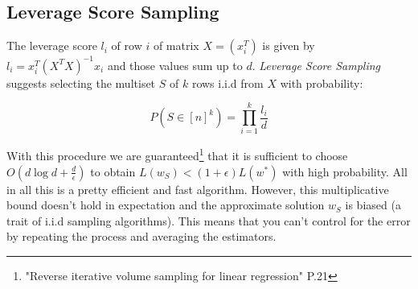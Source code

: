 \documentclass{article}
\begin{document}
        \subsection{Leverage Score Sampling}
            The leverage score $l_{i}$ of row $i$ of matrix $X=(x_{i}^T)$ is given by $l_{i}=x_{i}^T(X^TX)^{-1}x_{i}$ and those
            values sum up to $d$.
            \textit{Leverage Score Sampling} suggests selecting the multiset $S$ of $k$ rows i.i.d from $X$ with probability:

            \begin{equation}
            P(S\in{[n]^k})=\prod_{i=1}^{k}\frac{l_{i}}{d}
            \end{equation}

            With this procedure we are guaranteed\footnote{\label{leverage_score_performance_1}"Reverse iterative volume
            sampling for linear regression" P.21} that it is sufficient to choose
            $O(d\log{d}+\frac{d}{\epsilon})$ to obtain $L(w_{S}) < (1+\epsilon)L(w^\ast)$ with high probability.
            All in all this is a pretty efficient and fast algorithm.
            However, this multiplicative bound doesn't hold in expectation and the approximate solution $w_{S}$ is biased (a
            trait of i.i.d sampling algorithms). This means that you can't control for the error by repeating the process
            and averaging the estimators.
\end{document}
